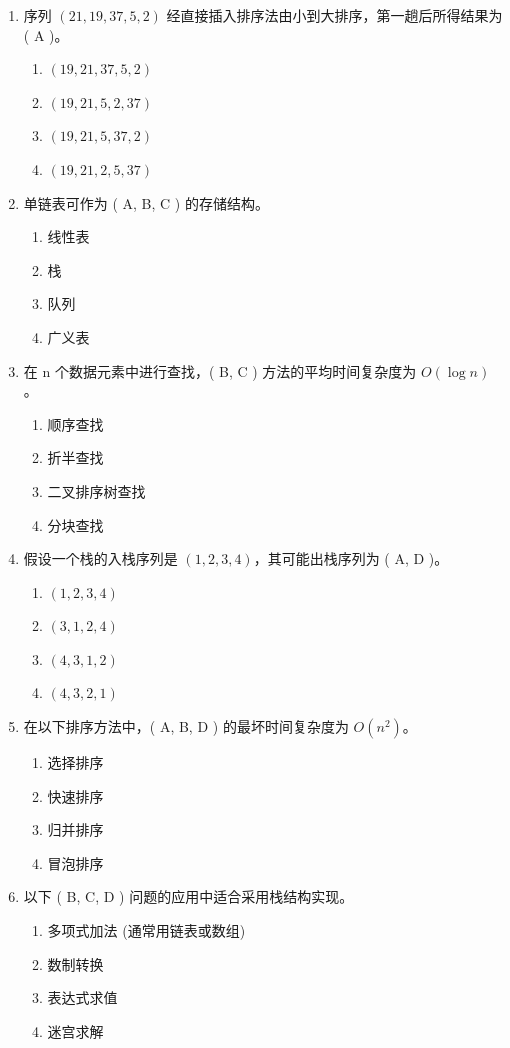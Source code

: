 \documentclass[12pt, a4paper]{article}
\begin{document}
\begin{enumerate}[label=\arabic*.]
    \item 序列 $(21, 19, 37, 5, 2)$ 经直接插入排序法由小到大排序，第一趟后所得结果为 ( A )。
    \begin{enumerate}
        \item $(19, 21, 37, 5, 2)$
        \item $(19, 21, 5, 2, 37)$
        \item $(19, 21, 5, 37, 2)$
        \item $(19, 21, 2, 5, 37)$
    \end{enumerate}

    \item 单链表可作为 ( A, B, C ) 的存储结构。
    \begin{enumerate}
        \item 线性表
        \item 栈
        \item 队列
        \item 广义表
    \end{enumerate}

    \item 在 n 个数据元素中进行查找，( B, C ) 方法的平均时间复杂度为 $O(\log n)$。
    \begin{enumerate}
        \item 顺序查找
        \item 折半查找
        \item 二叉排序树查找
        \item 分块查找
    \end{enumerate}

    \item 假设一个栈的入栈序列是 $(1, 2, 3, 4)$，其可能出栈序列为 ( A, D )。
    \begin{enumerate}
        \item $(1, 2, 3, 4)$
        \item $(3, 1, 2, 4)$
        \item $(4, 3, 1, 2)$
        \item $(4, 3, 2, 1)$
    \end{enumerate}

    \item 在以下排序方法中，( A, B, D ) 的最坏时间复杂度为 $O(n^2)$。
    \begin{enumerate}
        \item 选择排序
        \item 快速排序
        \item 归并排序
        \item 冒泡排序
    \end{enumerate}

    \item 以下 ( B, C, D ) 问题的应用中适合采用栈结构实现。
    \begin{enumerate}
        \item 多项式加法 (通常用链表或数组)
        \item 数制转换
        \item 表达式求值
        \item 迷宫求解
    \end{enumerate}
\end{enumerate}
\end{document}
